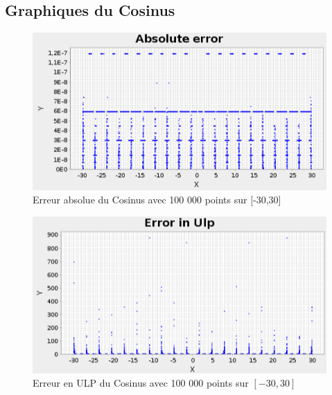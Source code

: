 \documentclass[12pt]{article}
\begin{document}
\subsection{Graphiques du Cosinus}

\begin{figure}[h!]
  \begin{center}
    \includegraphics[scale=0.33]{ErrorAbsCosMini.png}
    \caption{Erreur absolue du Cosinus avec 100 000 points sur [-30,30]}
    \label{Erreur asolue du Cosinus avec 100 000 points sur [-30,30]}
  \end{center}
\end{figure}
\begin{figure}[h!]
  \begin{center}
    \includegraphics[scale=0.33]{ErrorUlpMini.png}
    \caption{Erreur en ULP du Cosinus avec 100 000 points sur $[-30,30]$}
    \label{Erreur en ULP du Cosinus avec 100 000 points sur $[-30,30]$}
  \end{center}
\end{figure}
\end{document}
